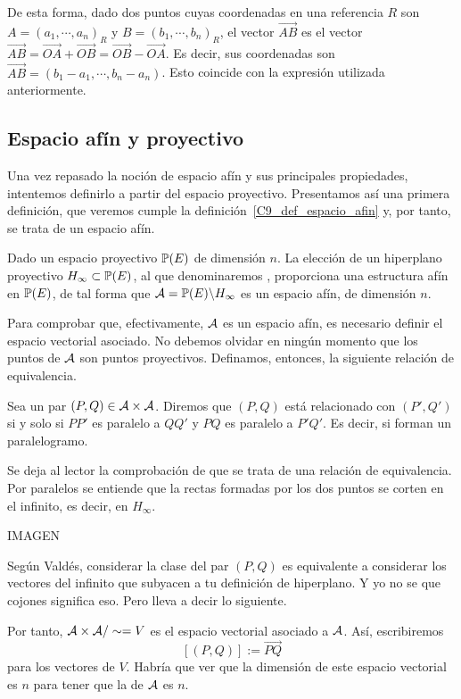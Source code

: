 De esta forma, dado dos puntos cuyas coordenadas en una referencia $R$ son $A=(a_1,\cdots,a_n)_R$ y $B=(b_1,\cdots,b_n)_R$, el vector $\overrightarrow{AB}$ es el vector $\overrightarrow{AB}=\overrightarrow{OA}+\overrightarrow{OB}=\overrightarrow{OB}-\overrightarrow{OA}$. Es decir, sus coordenadas son $\overrightarrow{AB}=(b_1-a_1,\cdots,b_n-a_n)$. Esto coincide con la expresión utilizada anteriormente.

\subsection{Espacio afín y proyectivo}
Una vez repasado la noción de espacio afín y sus principales propiedades, intentemos definirlo a partir del espacio proyectivo. Presentamos así una primera definición, que veremos cumple la definición~\ref{C9_def_espacio_afin} y, por tanto, se trata de un espacio afín.
\begin{defi}
	Dado un espacio proyectivo $\mathbb{P}(E)$ de dimensión $n$. La elección de un hiperplano proyectivo $H_\infty\subset \mathbb{P}(E)$, al que denominaremos , proporciona una estructura afín en $\mathbb{P}(E)$, de tal forma que $\mathcal{A}=\mathbb{P}(E)\backslash H_\infty$ es un espacio afín, de dimensión $n$.
\end{defi}
Para comprobar que, efectivamente, $\mathcal{A}$ es un espacio afín, es necesario definir el espacio vectorial asociado. No debemos olvidar en ningún momento que los puntos de $\mathcal{A}$ son puntos proyectivos. Definamos, entonces, la siguiente relación de equivalencia.
\begin{defi}
	Sea un par $(P,Q)\in\mathcal{A}\times\mathcal{A}$. Diremos que $(P,Q)$ está relacionado con $(P',Q')$ si y solo si $PP'$ es paralelo a $QQ'$ y $PQ$ es paralelo a $P'Q'$. Es decir, si forman un paralelogramo.
\end{defi}
Se deja al lector la comprobación de que se trata de una relación de equivalencia. Por paralelos se entiende que la rectas formadas por los dos puntos se corten en el infinito, es decir, en $H_\infty$.

IMAGEN

Según Valdés, considerar la clase del par $(P,Q)$ es equivalente a considerar los vectores del infinito que subyacen a tu definición de hiperplano. Y yo no se que cojones significa eso. Pero lleva a decir lo siguiente.

Por tanto, $\mathcal{A}\times\mathcal{A}/\sim=V$ es el espacio vectorial asociado a $\mathcal{A}$. Así, escribiremos
\[[(P,Q)]:=\overrightarrow{PQ}\]
para los vectores de $V$. Habría que ver que la dimensión de este espacio vectorial es $n$ para tener que la de $\mathcal{A}$ es $n$.\\

